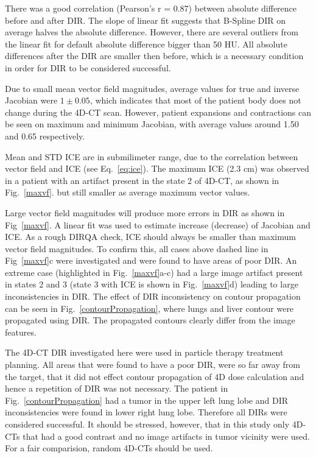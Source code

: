 \documentclass[type=dr, dr=rernat, accentcolor=tud7b,colorbacktitle, bigchapter, openright, twoside, 12pt ]{tudthesis}
\begin{document}
There was a good correlation (Pearson's r = 0.87) between absolute difference before and after DIR. The slope of linear fit suggests that B-Spline DIR on average halves the absolute difference. However, there are several outliers from the
linear fit for default absolute difference bigger than 50 HU. All absolute differences after the DIR are smaller then before, which is a necessary condition in order for DIR to be considered successful.


Due to small mean vector field magnitudes, average values for true and inverse Jacobian were $1\pm0.05$, which indicates that most of the patient body does not change during the 4D-CT
scan. However, patient expansions and contractions can be seen on maximum and minimum Jacobian, with average values around 1.50 and 0.65 respectively. 

Mean and STD ICE are in submilimeter range, due to the correlation between vector field and ICE (see Eq.~\ref{eq:ice}). The maximum ICE (2.3 cm) was observed in a patient with 
an artifact present in the state 2 of 4D-CT, as shown in Fig.~\ref{maxvf}.
but still smaller as average maximum vector values. 

Large vector field magnitudes will produce more errors in DIR as shown in Fig~\ref{maxvf}. A linear fit was used to estimate increase (decrease) of Jacobian and ICE. 
As a rough DIRQA check, ICE should always be smaller than maximum vector field magnitudes. To confirm this, all cases above dashed line in Fig~\ref{maxvf}c 
were investigated and were found to have areas of poor DIR. An extreme case (highlighted in Fig.~\ref{maxvf}a-c)
had a large image artifact present in states 2 and 3 (state 3 with ICE is shown in Fig.~\ref{maxvf}d) leading to large inconsistencies in DIR. 
The effect of DIR inconsistency on contour propagation can be seen in Fig.~\ref{contourPropagation},
where lungs and liver contour were propagated using DIR. The propagated contours clearly differ from the image features.

The 4D-CT DIR investigated here were used in particle therapy treatment planning. All areas that were found to have a poor DIR, were so far away from the target, that it did not effect contour propagation of 4D dose calculation and
hence a repetition of DIR was not necessary.
The patient in Fig.~\ref{contourPropagation} had a tumor in the upper left lung lobe and DIR inconsistencies were found in lower right lung lobe. 
Therefore all DIRs were considered successful. It should be stressed, however, that in this study only 4D-CTs that had a good contrast and no image artifacts in tumor vicinity were used. For a 
fair comparision, random 4D-CTs should be used.
\end{document}
